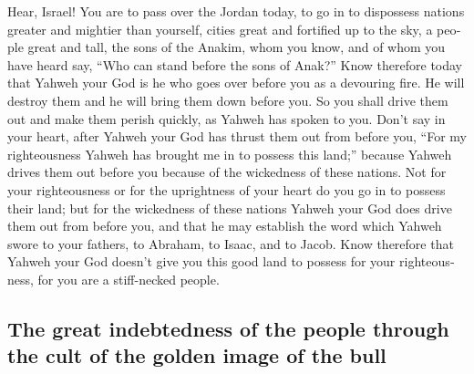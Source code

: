 \begin{paracol}{2}
\begin{otherlanguage}{english}
 Hear, Israel! You are to pass over the Jordan today, to
go in to dispossess nations greater and mightier than yourself, cities
great and fortified up to the sky,  a people great and
tall, the sons of the Anakim, whom you know, and of whom you have heard
say, ``Who can stand before the sons of Anak?''  Know
therefore today that Yahweh your God is he who goes over before you as a
devouring fire. He will destroy them and he will bring them down before
you. So you shall drive them out and make them perish quickly, as Yahweh
has spoken to you.  Don't say in your heart, after Yahweh
your God has thrust them out from before you, ``For my righteousness
Yahweh has brought me in to possess this land;'' because Yahweh drives
them out before you because of the wickedness of these nations.
 Not for your righteousness or for the uprightness of your
heart do you go in to possess their land; but for the wickedness of
these nations Yahweh your God does drive them out from before you, and
that he may establish the word which Yahweh swore to your fathers, to
Abraham, to Isaac, and to Jacob.  Know therefore that
Yahweh your God doesn't give you this good land to possess for your
righteousness, for you are a stiff-necked people.

\hypertarget{the-great-indebtedness-of-the-people-through-the-cult-of-the-golden-image-of-the-bull}{%
\subsection{The great indebtedness of the people through the cult of the
golden image of the
bull}\label{the-great-indebtedness-of-the-people-through-the-cult-of-the-golden-image-of-the-bull}}


\end{otherlanguage}
\end{paracol}
